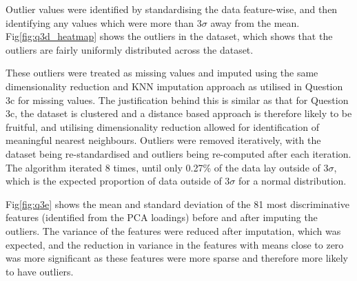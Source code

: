     Outlier values were identified by standardising the data feature-wise, and then identifying any values which were
    more than $3\sigma$ away from the mean.
    Fig\eqref{fig:q3d_heatmap} shows the outliers in the dataset, which shows that the outliers are fairly uniformly
    distributed across the dataset.

    These outliers were treated as missing values and imputed using the same dimensionality reduction and KNN imputation
    approach as utilised in Question 3c for missing values.
    The justification behind this is similar as that for Question 3c, the dataset is clustered and a distance based
    approach is therefore likely to be fruitful, and utilising dimensionality reduction allowed for identification of
    meaningful nearest neighbours.
    Outliers were removed iteratively, with the dataset being re-standardised and outliers being re-computed after each
    iteration.
    The algorithm iterated 8 times, until only 0.27\% of the data lay outside of $3\sigma$, which is the expected
    proportion of data outside of $3\sigma$ for a normal distribution.

    Fig\eqref{fig:q3e} shows the mean and standard deviation of the 81 most discriminative features (identified from
    the PCA loadings) before and after imputing the outliers.
    The variance of the features were reduced after imputation, which was expected, and the reduction in variance in the
    features with means close to zero was more significant as these features were more sparse and therefore more
    likely to have outliers.
